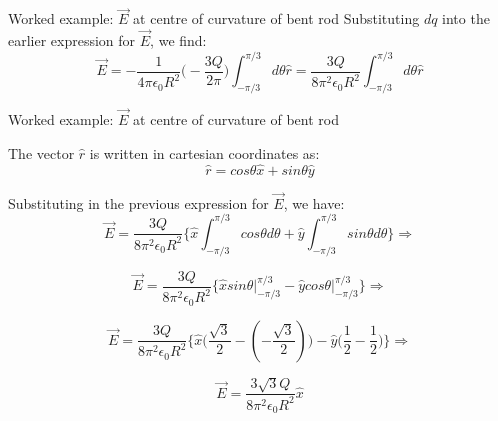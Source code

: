 {\begin{frame}{Worked example: $\vec{E}$ at centre of curvature of bent rod}
Substituting $dq$ into the earlier expression for $\vec{E}$, we find:
\begin{equation*}
  \vec{E} =
   -\frac{1}{4\pi\epsilon_0 R^2} \Big(-\frac{3Q}{2\pi}\Big) \int_{-\pi/3}^{\pi/3} d\theta \hat{r} =
   \frac{3Q}{8\pi^2\epsilon_0 R^2} \int_{-\pi/3}^{\pi/3} d\theta \hat{r}
\end{equation*}

\end{frame}

%
%
%

\begin{frame}{Worked example: $\vec{E}$ at centre of curvature of bent rod}

The vector $\hat{r}$ is written in cartesian coordinates as:
\begin{equation*}
  \hat{r} = cos\theta \hat{x} + sin\theta \hat{y}
\end{equation*}

Substituting in the previous expression for $\vec{E}$, we have:
\begin{equation*}
  \vec{E} =
   \frac{3Q}{8\pi^2\epsilon_0 R^2}
   \Big\{ \hat{x} \int_{-\pi/3}^{\pi/3} cos\theta d\theta +
          \hat{y} \int_{-\pi/3}^{\pi/3} sin\theta d\theta
   \Big\} \Rightarrow
\end{equation*}

\begin{equation*}
  \vec{E} =
   \frac{3Q}{8\pi^2\epsilon_0 R^2}
   \Big\{ \hat{x} sin\theta \Big\rvert_{-\pi/3}^{\pi/3} -
          \hat{y} cos\theta \Big\rvert_{-\pi/3}^{\pi/3}
   \Big\} \Rightarrow
\end{equation*}

\begin{equation*}
  \vec{E} =
   \frac{3Q}{8\pi^2\epsilon_0 R^2}
   \Big\{ \hat{x} \Big( \frac{\sqrt{3}}{2} - (-\frac{\sqrt{3}}{2}) \Big) -
          \hat{y} \Big( \frac{1}{2} - \frac{1}{2} \Big)
   \Big\} \Rightarrow
\end{equation*}

\begin{equation*}
  \vec{E} =
   \frac{3\sqrt{3}Q}{8\pi^2\epsilon_0 R^2} \hat{x}
\end{equation*}

\end{frame}

} %


%
%

